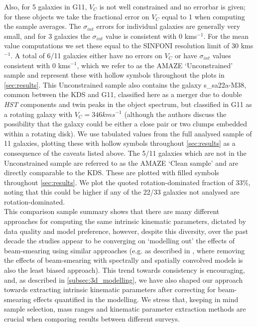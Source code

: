 \documentclass[fleqn,usenatbib]{mnras}
\begin{document}
Also, for 5 galaxies in G11, $V_{C}$ is not well constrained and no errorbar is given; for these objects we take the fractional error on $V_{C}$ equal to 1 when computing the sample averages.
The $\sigma_{int}$ errors for individual galaxies are generally very small, and for 3 galaxies the $\sigma_{int}$ value is consistent with 0 kms$^{-1}$.
For the mean value computations we set these equal to the SINFONI resolution limit of 30 kms$^{-1}$.
A total of 6/11 galaxies either have no errors on $V_{C}$ or have $\sigma_{int}$ values consistent with 0 kms$^{-1}$, which we refer to as the AMAZE `Unconstrained' sample and represent these with hollow symbols throughout the plots in \cref{sec:results}.
This Unconstrained sample also contains the galaxy s\_sa22a-M38, common between the KDS and G11, classified here as a merger due to double {\em HST} components and twin peaks in the object spectrum, but classified in G11 as a rotating galaxy with $V_{C} = 346 kms^{-1}$ (although the authors discuss the possibility that the galaxy could be either a close pair or two clumps embedded within a rotating disk).
We use tabulated values from the full analysed sample of 11 galaxies, plotting these with hollow symbols throughout \cref{sec:results} as a consequence of the caveats listed above.
The 5/11 galaxies which are not in the Unconstrained sample are referred to as the AMAZE `Clean sample' and are directly comparable to the KDS.
These are plotted with filled symbols throughout \cref{sec:results}.
We plot the quoted rotation-dominated fraction of 33$\%$, noting that this could be higher if any of the 22/33 galaxies not analysed are rotation-dominated. \\
 
This comparison sample summary shows that there are many different approaches for computing the same intrinsic kinematic parameters, dictated by data quality and model preference, however, despite this diversity, over the past decade the studies appear to be converging on `modelling out' the effects of beam-smearing using similar approaches (e.g. as described in \citealt{Davies2011}, where removing the effects of beam-smearing with spectrally and spatially convolved models is also the least biased approach).
This trend towards consistency is encouraging, and, as described in \cref{subsec:3d_modelling}, we have also shaped our approach towards extracting intrinsic kinematic parameters after correcting for beam-smearing effects quantified in the modelling.
We stress that, keeping in mind sample selection, mass ranges and kinematic parameter extraction methods are crucial when comparing results between different surveys.
\end{document}
